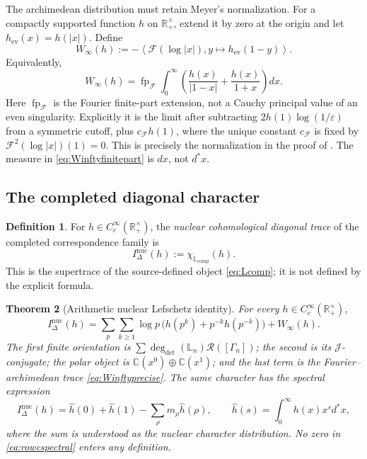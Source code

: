 \documentclass[11pt]{amsart}
\newtheorem{theorem}{Theorem}[section]
\theoremstyle{definition}
\newtheorem{definition}[theorem]{Definition}
\theoremstyle{remark}
\newcommand{\C}{\mathbb C}
\newcommand{\R}{\mathbb R}
\begin{document}
The archimedean distribution must retain Meyer's normalization.  For a
compactly supported function $h$ on $\R_+^\times$, extend it by zero at the
origin and let $h_{\mathrm{ev}}(x)=h(|x|)$.  Define
\begin{equation}\label{eq:Winftyprecise}
 W_\infty(h):=-\left\langle\mathcal F(\log|x|),
                 y\longmapsto h_{\mathrm{ev}}(1-y)\right\rangle.
\end{equation}
Equivalently,
\begin{equation}\label{eq:Winftyfinitepart}
 W_\infty(h)=\operatorname{fp}_{\mathcal F}\int_0^\infty
 \left(\frac{h(x)}{|1-x|}+\frac{h(x)}{1+x}\right)dx.
\end{equation}
Here $\operatorname{fp}_{\mathcal F}$ is the Fourier finite-part extension,
not a Cauchy principal value of an even singularity.  Explicitly it is the
limit after subtracting $2h(1)\log(1/\varepsilon)$ from a symmetric cutoff,
plus $c_{\mathcal F}h(1)$, where the unique constant $c_{\mathcal F}$ is
fixed by
$\mathcal F^2(\log|x|)(1)=0$.  This is precisely the normalization in the
proof of \cite[Theorem~5.8]{MeyerZeta}.  The measure in
\eqref{eq:Winftyfinitepart} is $dx$, not $d^*x$.

\subsection{The completed diagonal character}

\begin{definition}\label{def:nuclearintersection}
For $h\in C_c^\infty(\R_+^\times)$, the \emph{nuclear cohomological
diagonal trace} of the completed correspondence family is
\begin{equation}\label{eq:nuclearintersection}
 I_\Delta^{\mathrm{nuc}}(h)
 :=\chi_{\mathbb L_{\mathrm{comp}}}(h).
\end{equation}
This is the supertrace of the source-defined object
\eqref{eq:Lcomp}; it is not defined by the explicit formula.
\end{definition}

\begin{theorem}[Arithmetic nuclear Lefschetz identity]
\label{thm:rowc}
For every $h\in C_c^\infty(\R_+^\times)$,
\begin{equation}\label{eq:rowcidentity}
 \boxed{
 I_\Delta^{\mathrm{nuc}}(h)=
 \sum_p\sum_{k\geq1}\log p\,
 \bigl(h(p^k)+p^{-k}h(p^{-k})\bigr)+W_\infty(h).}
\end{equation}
The first finite orientation is
$\sum\deg_{\det}(\mathbb L_n)\mathcal R([\Gamma_n])$;
the second is its $\mathscr J$-conjugate; the polar object is
$\C(x^0)\oplus\C(x^1)$; and the last term is the Fourier--archimedean trace
\eqref{eq:Winftyprecise}.  The same character has the spectral expression
\begin{equation}\label{eq:rowcspectral}
 I_\Delta^{\mathrm{nuc}}(h)=\widehat h(0)+\widehat h(1)
 -\sum_\rho m_\rho\widehat h(\rho),\qquad
 \widehat h(s)=\int_0^\infty h(x)x^s d^*x,
\end{equation}
where the sum is understood as the nuclear character distribution.  No zero
in \eqref{eq:rowcspectral} enters any definition.
\end{theorem}
\end{document}
